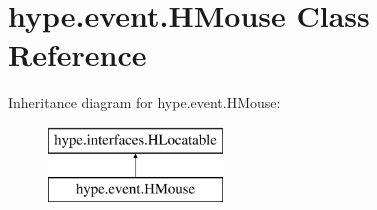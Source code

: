 \hypertarget{classhype_1_1event_1_1_h_mouse}{\section{hype.\-event.\-H\-Mouse Class Reference}
\label{classhype_1_1event_1_1_h_mouse}
}
Inheritance diagram for hype.\-event.\-H\-Mouse\-:\begin{figure}[H]
\begin{center}
\leavevmode
\includegraphics[height=2.000000cm]{classhype_1_1event_1_1_h_mouse}
\end{center}
\end{figure}
